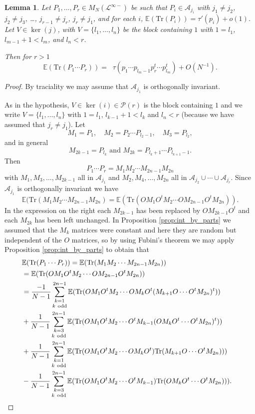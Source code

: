 \documentclass[11pt]{amsart}
\newtheorem{lemma}[theorem]{Lemma}
\theoremstyle{definition}
\numberwithin{theorem}{section}
\newcommand{\cA}{\mathcal{A}}
\newcommand{\cL}{\mathcal{L}}
\newcommand{\cP}{\mathcal{P}}
\newcommand{\rE} {\mathbb{E}}
\newcommand{\Tr}{\mathrm{Tr}}
\begin{document}
\begin{lemma}\label{lemma:inside induction}
Let $P_1, \dots, P_r \in M_N(\cL^{\infty-})$ be such that
$P_i \in \cA_{j_i}$ with $j_1 \not= j_2$, $j_2 \not = j_3$,
\dots, $j_{r-1} \not = j_r$, $j_r \not = j_1$, and for each
$i$, $\rE(\Tr(P_i)) = \tau'(p_i) + o(1)$. Let $V \in
\ker(j)$, with $V = \{l_1, \dots, l_n\}$ be the block
containing $1$ with $1 = l_1$, $l_{m-1} + 1 < l_m$, and $l_n
< r$.

Then for $r > 1$
\begin{equation}\label{eq:intermediate limit distribution}
\rE(\Tr(P_1 \cdots P_r))
=
\mathop{\sum_{m=2}^{n}}
\tau(p_1 \cdots p_{l_m-1} p_r^t \cdots p_{l_m}^t )  + O(N^{-1}).
\end{equation}
\end{lemma}

\begin{proof} 
By traciality we may assume that $\cA_{j_1}$ is orthogonally invariant. 


As in the hypothesis, $ V \in \ker(i) \in \cP(r)$ is the
block containing $1$ and we write $V = \{ l_1, \dots, l_n\}$
with $1 = l_1$, $l_{k-1} + 1 < l_k$ and $l_n < r$ (because
we have assumed that $j_r \not = j_1$). Let
\[
M_1 = P_1, \quad M_2 = P_2 \cdots P_{l_2 -1},\quad M_3 = P_{l_2},\]
and in general 
\[
M_{2k-1} = P_{l_k} \mbox{\ and\ } M_{2k} = P_{l_k + 1} \cdots P_{l_{k+1} - 1}. 
\]
Then 
\[
P_1 \cdots P_r = M_1 M_2 \cdots M_{2n-1} M_{2n}
\]
with $M_1, M_3, \dots, M_{2k-1}$ all in $\cA_{j_1}$ and
$M_2, M_4, \dots, M_{2n}$ all in $\cA_{j_2} \cup \cdots \cup
\cA_{j_r}$. Since $\cA_{j_1}$ is orthogonally invariant we
have
\[
\rE(\Tr(M_1 M_2 \cdots M_{2n-1} M_{2n}) 
=
\rE(\Tr(OM_1 O^t M_2 \cdots O M_{2n-1} O^t M_{2n})).
\]
In the expression on the right each $M_{2k-1}$ has been
replaced by $OM_{2k-1}O^t$ and each $M_{2k}$ has been left
unchanged. In Proposition \ref{prop:int_by_parts} we assumed
that the $M_k$ matrices were constant and here they are
random but independent of the $O$ matrices, so by using
Fubini's theorem we may apply Proposition
\ref{prop:int_by_parts} to obtain that
\begin{align}\lefteqn{
\rE(\Tr(P_1 \cdots P_r)) = \rE(\Tr(M_1 M_2 \cdots M_{2n - 1} M_{2 n}))} \notag \\
&\mbox{} =
\rE(\Tr(OM_1O^t M_2 \cdots OM_{2n - 1}O^t M_{2 n})) \notag \\
& \mbox{} =
\label{eq:first case}
\frac{-1}{N - 1} \mathop{\sum_{k=1}^{2n - 1}}_{k \mathrm{\ odd}}
\rE( \Tr(O M_1 O^t M_2 \cdots O M_kO^t (M_{k + 1} O \cdots O^t M_{2n})^t )) \\
& \mbox{} +
\label{eq:second case}
\frac{1}{N - 1} \mathop{\sum_{k=3}^{2n - 1}}_{k \mathrm{\ odd}}
\rE( \Tr(O M_1 O^t M_2 \cdots O^t M_{k-1} (O M_{k} O^t \cdots O^t M_{2n})^t )) \\
& \mbox{} +
\label{eq:third case}
\frac{1}{N - 1} \mathop{\sum_{k=1}^{2n - 1}}_{k \mathrm{\ odd}}
\rE( \Tr(O M_1 O^t M_2 \cdots O M_{k}O^t) \Tr(M_{k+1} O \cdots O^t M_{2n}) )) \\
& \mbox{} -
\label{eq:fourth case}
\frac{1}{N - 1} \mathop{\sum_{k=3}^{2n - 1}}_{k \mathrm{\ odd}}
\rE( \Tr(O M_1 O^t M_2 \cdots O^t M_{k-1}) \Tr(OM_{k} O^t \cdots O^t M_{2n}) )).
\end{align}


\end{proof}
\end{document}
